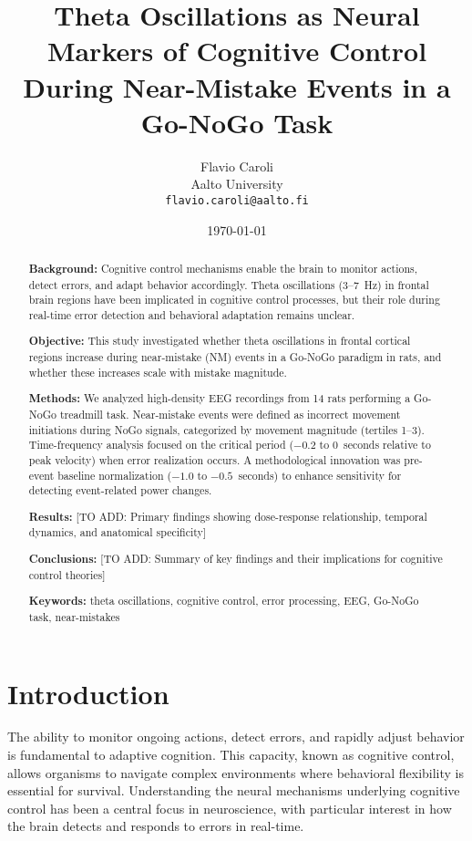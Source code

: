 \documentclass[11pt]{article}
\title{Theta Oscillations as Neural Markers of Cognitive Control During Near-Mistake Events in a Go-NoGo Task}
\author{
  Flavio Caroli \\
  Aalto University \\
  \texttt{flavio.caroli@aalto.fi}
}
\date{\today}
\begin{document}
\maketitle

\begin{abstract}
\textbf{Background:} Cognitive control mechanisms enable the brain to monitor actions, detect errors, and adapt behavior accordingly. Theta oscillations (3--7~Hz) in frontal brain regions have been implicated in cognitive control processes, but their role during real-time error detection and behavioral adaptation remains unclear.

\textbf{Objective:} This study investigated whether theta oscillations in frontal cortical regions increase during near-mistake (NM) events in a Go-NoGo paradigm in rats, and whether these increases scale with mistake magnitude.

\textbf{Methods:} We analyzed high-density EEG recordings from 14 rats performing a Go-NoGo treadmill task. Near-mistake events were defined as incorrect movement initiations during NoGo signals, categorized by movement magnitude (tertiles 1--3). Time-frequency analysis focused on the critical period ($-0.2$ to $0$~seconds relative to peak velocity) when error realization occurs. A methodological innovation was pre-event baseline normalization ($-1.0$ to $-0.5$~seconds) to enhance sensitivity for detecting event-related power changes.

\textbf{Results:} [TO ADD: Primary findings showing dose-response relationship, temporal dynamics, and anatomical specificity]

\textbf{Conclusions:} [TO ADD: Summary of key findings and their implications for cognitive control theories]

\textbf{Keywords:} theta oscillations, cognitive control, error processing, EEG, Go-NoGo task, near-mistakes
\end{abstract}

\section{Introduction}

The ability to monitor ongoing actions, detect errors, and rapidly adjust behavior is fundamental to adaptive cognition. This capacity, known as cognitive control, allows organisms to navigate complex environments where behavioral flexibility is essential for survival. Understanding the neural mechanisms underlying cognitive control has been a central focus in neuroscience, with particular interest in how the brain detects and responds to errors in real-time.
\end{document}
